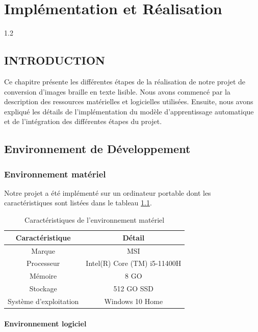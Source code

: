 \chapter{Implémentation et Réalisation}
\begin{spacing}{1.2}
\minitoc
\thispagestyle{MyStyle}
\end{spacing}
\newpage

\section{INTRODUCTION}
Ce chapitre présente les différentes étapes de la réalisation de notre projet de conversion d'images braille en texte lisible. Nous avons commencé par la description des ressources matérielles et logicielles utilisées. Ensuite, nous avons expliqué les détails de l'implémentation du modèle d'apprentissage automatique et de l'intégration des différentes étapes du projet.

\section{Environnement de Développement}
\subsection{Environnement matériel}
Notre projet a été implémenté sur un ordinateur portable dont les caractéristiques sont listées dans le tableau \ref{tab:caracteristiques}.

\begin{table}[H]
    \centering
    \begin{tabular}{|c|c|}
    \hline
    \textbf{Caractéristique} & \textbf{Détail} \\ \hline
    Marque & MSI \\ \hline
    Processeur & Intel(R) Core (TM) i5-11400H \\ \hline
    Mémoire & 8 GO \\ \hline
    Stockage & 512 GO SSD \\ \hline
    Système d'exploitation & Windows 10 Home \\ \hline
    \end{tabular}
    \caption{Caractéristiques de l'environnement matériel}
    \label{tab:caracteristiques}
\end{table}

\subsubsection{Environnement logiciel}
